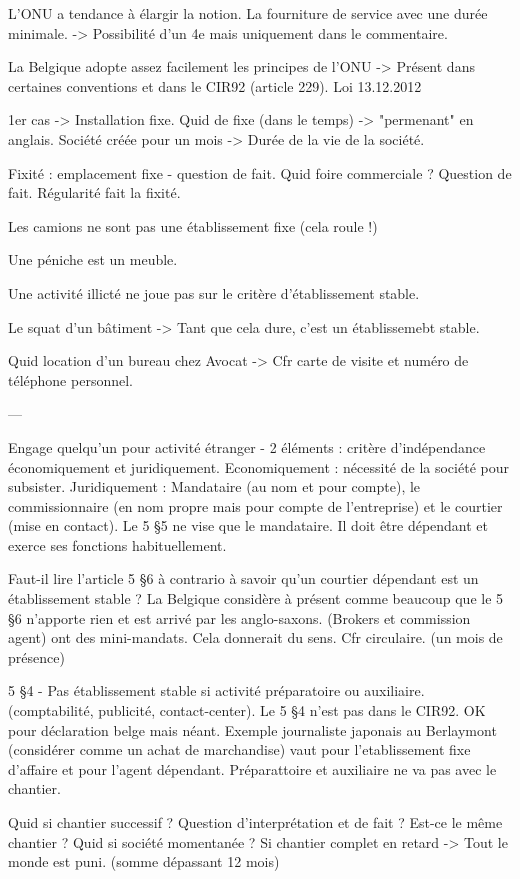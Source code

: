 \documentclass{book}
\begin{document}
L'ONU a tendance à élargir la notion. La fourniture de service avec une durée minimale. -> Possibilité d'un 4e mais uniquement dans le commentaire.

La Belgique adopte assez facilement les principes de l'ONU -> Présent dans certaines conventions et dans le CIR92 (article 229). Loi 13.12.2012

1er cas -> Installation fixe. Quid de fixe (dans le temps) -> "permenant" en anglais. Société créée pour un mois -> Durée de la vie de la société.

Fixité : emplacement fixe - question de fait. Quid foire commerciale ? Question de fait. Régularité fait la fixité.

Les camions ne sont pas une établissement fixe (cela roule !)

Une péniche est un meuble.

Une activité illicté ne joue pas sur le critère d'établissement stable.

Le squat d'un bâtiment -> Tant que cela dure, c'est un établissemebt stable.

Quid location d'un bureau chez Avocat -> Cfr carte de visite et numéro de téléphone personnel.

---

Engage quelqu'un pour activité étranger - 2 éléments : critère d'indépendance économiquement et juridiquement.
Economiquement : nécessité de la société pour subsister. Juridiquement : Mandataire (au nom et pour compte), le commissionnaire (en nom propre mais pour compte de l'entreprise) et le courtier (mise en contact). Le 5 §5 ne vise que le mandataire. Il doit être dépendant et exerce ses fonctions habituellement.

Faut-il lire l'article 5 §6 à contrario à savoir qu'un courtier dépendant est un établissement stable ? La Belgique considère à présent comme beaucoup que le 5 §6 n'apporte rien et est arrivé par les anglo-saxons. (Brokers et commission agent) ont des mini-mandats. Cela donnerait du sens. Cfr circulaire. (un mois de présence)

5 §4 - Pas établissement stable si activité préparatoire ou auxiliaire. (comptabilité, publicité, contact-center). Le 5 §4 n'est pas dans le CIR92. OK pour déclaration belge mais néant. Exemple journaliste japonais au Berlaymont (considérer comme un achat de marchandise) vaut pour l'etablissement fixe d'affaire et pour l'agent dépendant. Préparattoire et auxiliaire ne va pas avec le chantier.

Quid si chantier successif ? Question d'interprétation et de fait ? Est-ce le même chantier ?
Quid si société momentanée ? Si chantier complet en retard -> Tout le monde est puni. (somme dépassant 12 mois)
\end{document}

